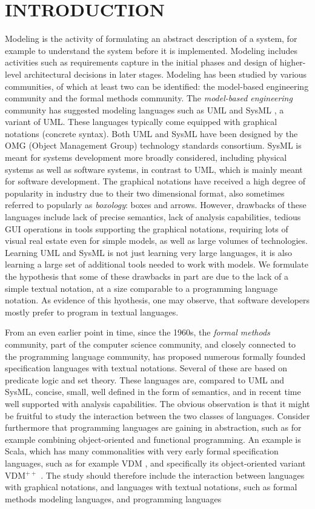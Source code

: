\section{INTRODUCTION}
\label{sec:introduction}

Modeling is the activity of formulating an abstract description of a
system, for example to understand the system before it is implemented.
Modeling includes activities such as requirements capture in the
initial phases and design of higher-level architectural decisions in
later stages. Modeling has been studied by various communities, of
which at least two can be identified: the model-based engineering
community and the formal methods community. The {\em model-based
  engineering} community has suggested modeling languages such as UML
\cite{uml} and SysML \cite{sysml}, a variant of UML.  These languages
typically come equipped with graphical notations (concrete syntax).
Both UML and SysML have been designed by the OMG (Object Management
Group) technology standards consortium. SysML is meant for systems
development more broadly considered, including physical systems as
well as software systems, in contrast to UML, which is mainly meant
for software development. The graphical notations have received a high
degree of popularity in industry due to their two dimensional format,
also sometimes referred to popularly as {\em boxology}: boxes and
arrows. However, drawbacks of these languages include lack of precise
semantics, lack of analysis capabilities, tedious GUI operations in
tools supporting the graphical notations, requiring lots of visual
real estate even for simple models, as well as large volumes of
technologies. Learning UML and SysML is not just learning very large
languages, it is also learning a large set of additional tools needed
to work with models. We formulate the hypothesis that some of these
drawbacks in part are due to the lack of a simple textual notation, at
a size comparable to a programming language notation. As evidence of
this hyothesis, one may observe, that software developers mostly
prefer to program in textual languages.

From an even earlier point in time, since the 1960s, the {\em formal
  methods} community, part of the computer science community, and
closely connected to the programming language community, has proposed
numerous formally founded specification languages with textual
notations. Several of these are based on predicate logic and set
theory. These languages are, compared to UML and SysML, concise,
small, well defined in the form of semantics, and in recent time well
supported with analysis capabilities. The obvious observation is that
it might be fruitful to study the interaction between the two classes
of languages. Consider furthermore that programming languages are
gaining in abstraction, such as for example combining object-oriented
and functional programming. An example is Scala, which has many
commonalities with very early formal specification languages, such as
for example VDM \cite{vdm78}, and specifically its object-oriented
variant VDM$^{++}$ \cite{vdmplusplus05}.  The study should therefore
include the interaction between languages with graphical notations,
and languages with textual notations, such as formal methods modeling
languages, and programming languages

